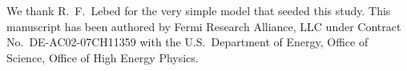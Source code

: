 \documentclass[aps,prd,twocolumn,superscriptaddress,nofootinbib]{revtex4-2}
\begin{document}
\begin{acknowledgments}
We thank R.~F.~Lebed for the very simple model that seeded this study.
This manuscript has been authored by Fermi Research Alliance, LLC
under Contract No.\ DE-AC02-07CH11359 with the U.S.\ Department of
Energy, Office of Science, Office of High Energy Physics.
\end{acknowledgments}

\appendix










\end{document}
